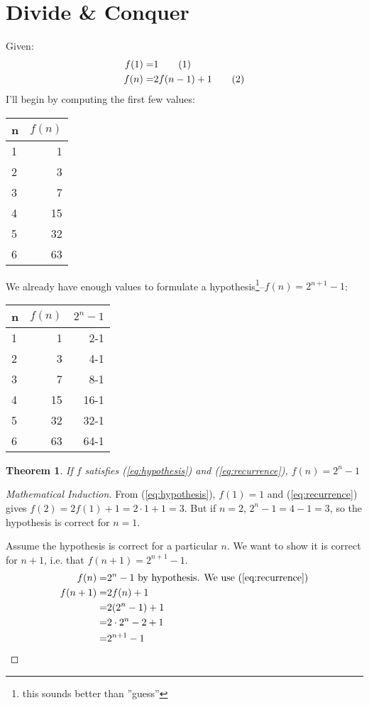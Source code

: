 \documentclass[]{article}
\newcommand\numberthis{\addtocounter{equation}{1}\tag{\theequation}}
\newtheorem{thm}{Theorem}
\begin{document}
\section{Divide \& Conquer}
Given:
\begin{align*}
	f(1)=&1 \numberthis \label{eq:hypothesis}\\
	f(n)=&2f(n-1)+1 \numberthis \label{eq:recurrence}
\end{align*}
I'll begin by computing the first few values:
\begin{table}[H]
	\begin{center}
		\begin{tabular}{|l|r|} \hline
			n&$f(n)$\\\hline
			1&1\\\hline
			2&3\\\hline
			3&7\\\hline
			4&15\\\hline
			5&32\\\hline
			6&63\\\hline
		\end{tabular}
	\end{center}
\end{table}
We already have enough values to formulate a hypothesis\footnote{this sounds better than ''guess''}--$f(n)=2^{n+1}-1$:
\begin{table}[H]
	\begin{center}
		\begin{tabular}[H]{|l|r|r|}\hline
			n&$f(n)$&$2^n-1$\\\hline
			1&1&2-1\\\hline
			2&3&4-1\\\hline
			3&7&8-1\\\hline
			4&15&16-1\\\hline
			5&32&32-1\\\hline
			6&63&64-1\\\hline
		\end{tabular}
	\end{center}
\end{table}

\begin{thm}
	If $f$ satisfies (\ref{eq:hypothesis}) and (\ref{eq:recurrence}), $f(n)=2^n-1$
\end{thm}

\begin{proof}[Mathematical Induction]
	
	From (\ref{eq:hypothesis}), $f(1)=1$ and (\ref{eq:recurrence}) gives $f(2)= 2f(1)+1 = 2\cdot1+1 =3$. But if $n=2$, $2^n-1=4-1=3$, so the hypothesis is correct for $n=1$.
	
	Assume the hypothesis is correct for a particular $n$. We want to show it is correct for $n+1$, i.e. that $f(n+1)=2^{n+1}-1$.
	\begin{align*}
		f(n)=&2^n-1	\text{ by hypothesis. We use (\ref{eq:recurrence})}\\
		f(n+1)=&2f(n) + 1 \\
		=& 2(2^n-1) + 1\\
		=& 2\cdot 2^n -2 +1\\
		=& 2^{n+1} -1 
	\end{align*}
\end{proof}
\end{document}
